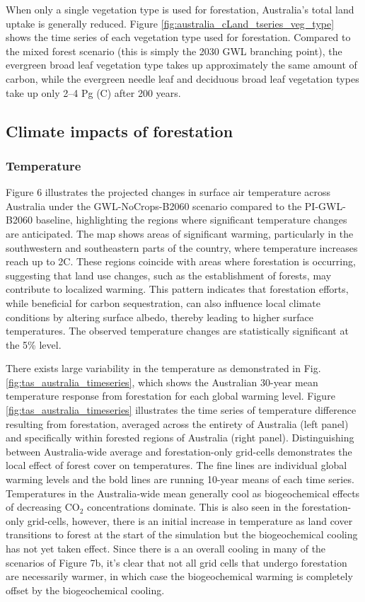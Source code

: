 \documentclass[]{article}
\begin{document}
When only a single vegetation type is used for forestation, Australia's total land uptake is generally reduced.
Figure \ref{fig:australia_cLand_tseries_veg_type} shows the time series of each vegetation type used for forestation.
Compared to the mixed forest scenario (this is simply the 2030 GWL branching point), the evergreen broad leaf vegetation type takes up approximately the same amount of carbon, while the evergreen needle leaf and deciduous broad leaf vegetation types take up only 2--4 Pg (C) after 200 years.

\subsection{Climate impacts of forestation}

\subsubsection{Temperature}

Figure 6 illustrates the projected changes in surface air temperature across Australia under the GWL-NoCrops-B2060 scenario compared to the PI-GWL-B2060 baseline, highlighting the regions where significant temperature changes are anticipated.
The map shows areas of significant warming, particularly in the southwestern and southeastern parts of the country, where temperature increases reach up to 2\textdegree{}C.
These regions coincide with areas where forestation is occurring, suggesting that land use changes, such as the establishment of forests, may contribute to localized warming.
This pattern indicates that forestation efforts, while beneficial for carbon sequestration, can also influence local climate conditions by altering surface albedo, thereby leading to higher surface temperatures.
The observed temperature changes are statistically significant at the 5\% level.

There exists large variability in the temperature as demonstrated in Fig. \ref{fig:tas_australia_timeseries}, which shows the Australian 30-year mean temperature response from forestation for each global warming level.
Figure \ref{fig:tas_australia_timeseries} illustrates the time series of temperature difference resulting from forestation, averaged across the entirety of Australia (left panel) and specifically within forested regions of Australia (right panel).
Distinguishing between Australia-wide average and forestation-only grid-cells demonstrates the local effect of forest cover on temperatures.
The fine lines are individual global warming levels and the bold lines are running 10-year means of each time series.
Temperatures in the Australia-wide mean generally cool as biogeochemical effects of decreasing CO$_2$ concentrations dominate.
This is also seen in the forestation-only grid-cells, however, there is an initial increase in temperature as land cover transitions to forest at the start of the simulation but the biogeochemical cooling has not yet taken effect.
Since there is a an overall cooling in many of the scenarios of Figure 7b, it's clear that not all grid cells that undergo forestation are necessarily warmer, in which case the biogeochemical warming is completely offset by the biogeochemical cooling.
\end{document}
